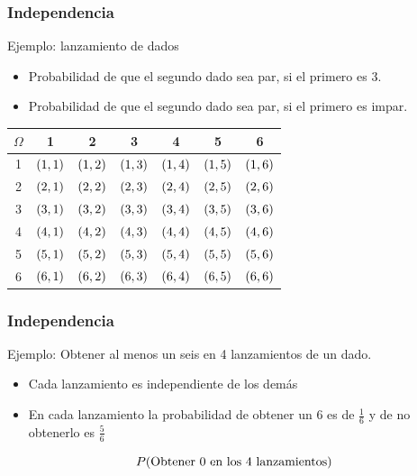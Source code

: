 \documentclass[table]{beamer}
\begin{document}
\begin{frame}
    \frametitle{Independencia}
    \begin{block}{Ejemplo: lanzamiento de dados}
        \begin{itemize}
            \item Probabilidad de que el segundo dado sea par, si el primero es 3.
            \item Probabilidad de que el segundo dado sea par, si el primero es impar.
        \end{itemize}
    \end{block}
    \begin{center}
        \begin{tabular}{c|cccccc}
            $\Omega$ & 1 & 2 & 3 & 4 & 5 & 6 \\
            \hline
            1 & $\parens{1, 1}$ & $\parens{1, 2}$ & $\parens{1, 3}$ & $\parens{1, 4}$ & $\parens{1, 5}$ & $\parens{1, 6}$ \\
            2 & $\parens{2, 1}$ & $\parens{2, 2}$ & $\parens{2, 3}$ & $\parens{2, 4}$ & $\parens{2, 5}$ & $\parens{2, 6}$ \\
            3 & $\parens{3, 1}$ & $\parens{3, 2}$ & $\parens{3, 3}$ & $\parens{3, 4}$ & $\parens{3, 5}$ & $\parens{3, 6}$ \\
            4 & $\parens{4, 1}$ & $\parens{4, 2}$ & $\parens{4, 3}$ & $\parens{4, 4}$ & $\parens{4, 5}$ & $\parens{4, 6}$ \\
            5 & $\parens{5, 1}$ & $\parens{5, 2}$ & $\parens{5, 3}$ & $\parens{5, 4}$ & $\parens{5, 5}$ & $\parens{5, 6}$ \\
            6 & $\parens{6, 1}$ & $\parens{6, 2}$ & $\parens{6, 3}$ & $\parens{6, 4}$ & $\parens{6, 5}$ & $\parens{6, 6}$ \\
        \end{tabular}
    \end{center}
\end{frame}

\begin{frame}

\frametitle{Independencia}
\begin{block}{Ejemplo: Obtener al menos un seis en 4 lanzamientos de un dado.}
    \begin{itemize}
        \item Cada lanzamiento es independiente de los demás
        \item En cada lanzamiento la probabilidad de obtener un 6 es de $\frac{1}{6}$ y de no obtenerlo es $\frac{5}{6}$
    \end{itemize}
    \begin{center}
        $$\prob{\mbox{Obtener 0 en los 4 lanzamientos}}$$
    \end{center}
\end{block}


\end{frame}
\end{document}
